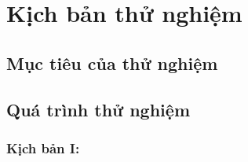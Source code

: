 \chapter{Kịch bản thử nghiệm} \label{chap:experiment}
    \section{Mục tiêu của thử nghiệm}
    \section{Quá trình thử nghiệm}
        \subsection{Kịch bản I:}